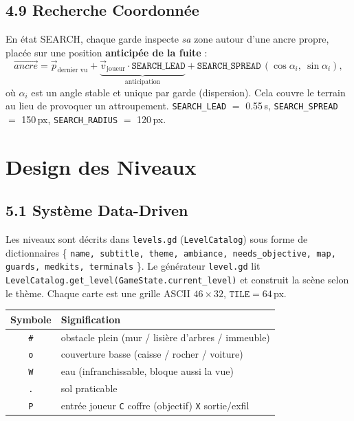 \documentclass[11pt,a4paper]{article}
\newcommand{\code}[1]{\colorbox{codebg}{\texttt{#1}}}
\newcommand{\param}[2]{\code{#1} $=$ #2}
\begin{document}
\subsection{4.9 Recherche Coordonn\'ee}
En \'etat SEARCH, chaque garde inspecte \emph{sa} zone autour d'une ancre propre,
plac\'ee sur une position \textbf{anticip\'ee de la fuite} :
\[
\vec{ancre} = \vec{p}_{\text{dernier vu}} + \underbrace{\vec{v}_{\text{joueur}}\cdot \texttt{SEARCH\_LEAD}}_{\text{anticipation}}
+ \texttt{SEARCH\_SPREAD}\,(\cos\alpha_i,\ \sin\alpha_i),
\]
o\`u $\alpha_i$ est un angle stable et unique par garde (dispersion). Cela couvre
le terrain au lieu de provoquer un attroupement. \param{SEARCH\_LEAD}{0.55}\,s,
\param{SEARCH\_SPREAD}{150}\,px, \param{SEARCH\_RADIUS}{120}\,px.

\section{Design des Niveaux}

\subsection{5.1 Syst\`eme Data-Driven}
Les niveaux sont d\'ecrits dans \code{levels.gd} (\code{LevelCatalog}) sous forme de
dictionnaires \{ \texttt{name, subtitle, theme, ambiance, needs\_objective, map,
guards, medkits, terminals} \}. Le g\'en\'erateur \code{level.gd} lit
\code{LevelCatalog.get\_level(GameState.current\_level)} et construit la sc\`ene
selon le th\`eme. Chaque carte est une grille ASCII $46\times32$, $\texttt{TILE}=64$\,px.

\begin{center}
\begin{tabular}{cl}
\toprule
\textbf{Symbole} & \textbf{Signification} \\
\midrule
\texttt{\#} & obstacle plein (mur / lisi\`ere d'arbres / immeuble) \\
\texttt{o} & couverture basse (caisse / rocher / voiture) \\
\texttt{W} & eau (infranchissable, bloque aussi la vue) \\
\texttt{.} & sol praticable \\
\texttt{P} & entr\'ee joueur \quad \texttt{C} coffre (objectif) \quad \texttt{X} sortie/exfil \\
\bottomrule
\end{tabular}
\end{center}
\end{document}

